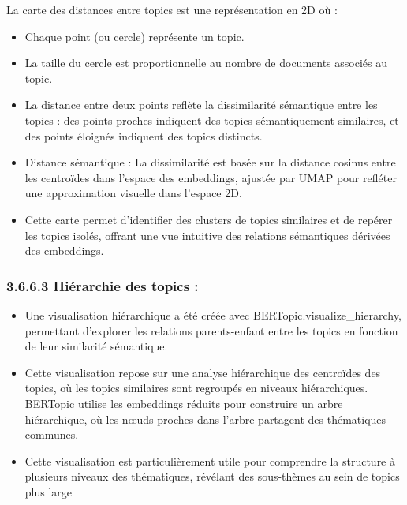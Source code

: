 \documentclass[mstat,12pt]{unswthesis}
\begin{document}
La carte des distances entre topics est une représentation en 2D où :

\begin{itemize}
    \item 
    
    Chaque point (ou cercle) représente un topic.
    
    \item 
    
    La taille du cercle est proportionnelle au nombre de documents associés au topic.
    
    \item 

    La distance entre deux points reflète la dissimilarité sémantique entre les topics : des points proches indiquent des topics sémantiquement similaires, et des points éloignés indiquent des topics distincts.
    
    \item 

    Distance sémantique : La dissimilarité est basée sur la distance cosinus entre les centroïdes dans l’espace des embeddings, ajustée par UMAP pour refléter une approximation visuelle dans l’espace 2D.
    
    \item 

    Cette carte permet d’identifier des clusters de topics similaires et de repérer les topics isolés, offrant une vue intuitive des relations sémantiques dérivées des embeddings.
    
\end{itemize}

\bigskip

\subsubsection{3.6.6.3   Hiérarchie des topics :}

\bigskip

\begin{itemize}
    \item 

    Une visualisation hiérarchique a été créée avec BERTopic.visualize\_hierarchy, permettant d’explorer les relations parents-enfant entre les topics en fonction de leur similarité sémantique.
    
    \item 

    Cette visualisation repose sur une analyse hiérarchique des centroïdes des topics, où les topics similaires sont regroupés en niveaux hiérarchiques. BERTopic utilise les embeddings réduits pour construire un arbre hiérarchique, où les nœuds proches dans l’arbre partagent des thématiques communes.
    
    \item 

    Cette visualisation est particulièrement utile pour comprendre la structure à plusieurs niveaux des thématiques, révélant des sous-thèmes au sein de topics plus large
    
\end{itemize}
\end{document}
